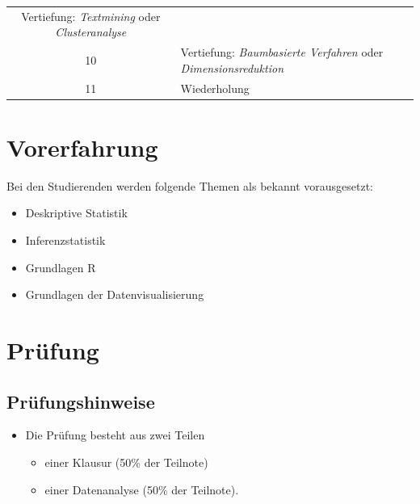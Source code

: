 \documentclass[12pt,ngerman,]{book}
\providecommand{\tightlist}{%
  \setlength{\itemsep}{0pt}\setlength{\parskip}{0pt}}
\begin{document}
\begin{longtable}[]{@{}cl@{}}
\begin{minipage}[t]{0.50\columnwidth}
Vertiefung: \emph{Textmining} oder \emph{Clusteranalyse}\strut
\end{minipage}\tabularnewline
\begin{minipage}[t]{0.12\columnwidth}\centering\strut
10\strut
\end{minipage} & \begin{minipage}[t]{0.50\columnwidth}\raggedright\strut
Vertiefung: \emph{Baumbasierte Verfahren} oder
\emph{Dimensionsreduktion}\strut
\end{minipage}\tabularnewline
\begin{minipage}[t]{0.12\columnwidth}\centering\strut
11\strut
\end{minipage} & \begin{minipage}[t]{0.50\columnwidth}\raggedright\strut
Wiederholung\strut
\end{minipage}\tabularnewline
\bottomrule
\end{longtable}

\section{Vorerfahrung}\label{vorerfahrung}

Bei den Studierenden werden folgende Themen als bekannt vorausgesetzt:

\begin{itemize}
\tightlist
\item
  Deskriptive Statistik
\item
  Inferenzstatistik
\item
  Grundlagen R
\item
  Grundlagen der Datenvisualisierung
\end{itemize}

\section{Prüfung}\label{prufung}

\subsection{Prüfungshinweise}\label{prufungshinweise}

\begin{itemize}
\tightlist
\item
  Die Prüfung besteht aus zwei Teilen

  \begin{itemize}
  \tightlist
  \item
    einer Klausur (50\% der Teilnote)
  \item
    einer Datenanalyse (50\% der Teilnote).
  \end{itemize}
\end{itemize}
\end{document}
